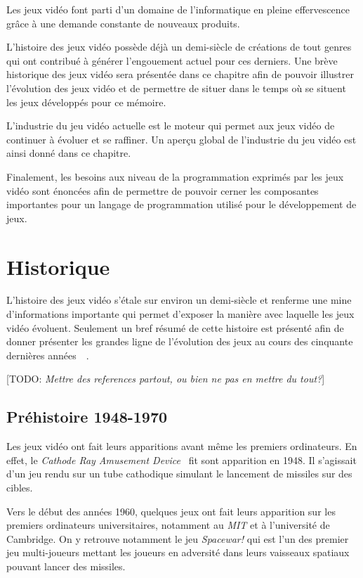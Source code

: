 \documentclass[12pt,oneside,letterpaper,francais]{book}
\newcommand{\todo}[1]{[TODO: {\it #1}]}
\begin{document}
Les jeux vidéo font parti d'un domaine de l'informatique en pleine
effervescence grâce à une demande constante de nouveaux
produits. 

L'histoire des jeux vidéo possède déjà un demi-siècle de créations de
tout genres qui ont contribué à générer l'engouement actuel pour ces
derniers. Une brève historique des jeux vidéo sera présentée dans ce
chapitre afin de pouvoir illustrer l'évolution des jeux vidéo et de
permettre de situer dans le temps où se situent les jeux développés
pour ce mémoire.

L'industrie du jeu vidéo actuelle est le moteur qui permet aux jeux
vidéo de continuer à évoluer et se raffiner. Un aperçu global de
l'industrie du jeu vidéo est ainsi donné dans ce chapitre.

Finalement, les besoins aux niveau de la programmation exprimés par
les jeux vidéo sont énoncées afin de permettre de pouvoir cerner les
composantes importantes pour un langage de programmation utilisé pour
le développement de jeux.


\section{Historique}

L'histoire des jeux vidéo s'étale sur environ un demi-siècle et
renferme une mine d'informations importante qui permet d'exposer la
manière avec laquelle les jeux vidéo évoluent. Seulement un bref
résumé de cette histoire est présenté afin de donner présenter les
grandes ligne de l'évolution des jeux au cours des cinquante dernières
années~\cite{VIDEOGAMES_history}~\cite{HISCORE}.

\todo{Mettre des references partout, ou bien ne pas en mettre du tout?}


\subsection{Préhistoire 1948-1970}
Les jeux vidéo ont fait leurs apparitions avant même les premiers
ordinateurs. En effet, le \textit{Cathode Ray Amusement
  Device}~\cite{CRTAD} fit sont apparition en 1948. Il s'agissait d'un
jeu rendu sur un tube cathodique simulant le lancement de missiles sur
des cibles. 

Vers le début des années 1960, quelques jeux ont fait leurs apparition
sur les premiers ordinateurs universitaires, notamment au \textit{MIT}
et à l'université de Cambridge. On y retrouve notamment le jeu
\textit{Spacewar!} qui est l'un des premier jeu multi-joueurs mettant
les joueurs en adversité dans leurs vaisseaux spatiaux pouvant lancer
des missiles. 
\end{document}
